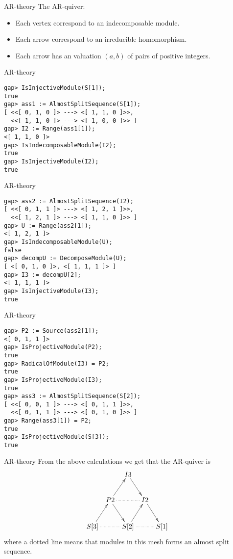 \begin{frame}[fragile]{AR-theory}
The AR-quiver:
\begin{itemize}
\item Each vertex correspond to an indecomposable module. 
\item Each arrow correspond to an irreducible homomorphism. 
\item Each arrow has an valuation $(a,b)$ of pairs of positive
  integers.  
\end{itemize}
\end{frame}

\begin{frame}[fragile]{AR-theory}
\begin{verbatim}
gap> IsInjectiveModule(S[1]);
true
gap> ass1 := AlmostSplitSequence(S[1]);
[ <<[ 0, 1, 0 ]> ---> <[ 1, 1, 0 ]>>, 
  <<[ 1, 1, 0 ]> ---> <[ 1, 0, 0 ]>> ]
gap> I2 := Range(ass1[1]);
<[ 1, 1, 0 ]>
gap> IsIndecomposableModule(I2);
true
gap> IsInjectiveModule(I2);
true
\end{verbatim}
\end{frame}

\begin{frame}[fragile]{AR-theory}
\begin{verbatim}
gap> ass2 := AlmostSplitSequence(I2);
[ <<[ 0, 1, 1 ]> ---> <[ 1, 2, 1 ]>>, 
  <<[ 1, 2, 1 ]> ---> <[ 1, 1, 0 ]>> ]
gap> U := Range(ass2[1]);
<[ 1, 2, 1 ]>
gap> IsIndecomposableModule(U);
false
gap> decompU := DecomposeModule(U);
[ <[ 0, 1, 0 ]>, <[ 1, 1, 1 ]> ]
gap> I3 := decompU[2];
<[ 1, 1, 1 ]>
gap> IsInjectiveModule(I3);
true
\end{verbatim}
\end{frame}

\begin{frame}[fragile]{AR-theory}
\begin{verbatim}
gap> P2 := Source(ass2[1]);
<[ 0, 1, 1 ]>
gap> IsProjectiveModule(P2);
true
gap> RadicalOfModule(I3) = P2;
true
gap> IsProjectiveModule(I3);
true
gap> ass3 := AlmostSplitSequence(S[2]);
[ <<[ 0, 0, 1 ]> ---> <[ 0, 1, 1 ]>>, 
  <<[ 0, 1, 1 ]> ---> <[ 0, 1, 0 ]>> ]
gap> Range(ass3[1]) = P2;
true
gap> IsProjectiveModule(S[3]);
true
\end{verbatim}
\end{frame}

\begin{frame}[fragile]{AR-theory}
From the above calculations we get that the AR-quiver is 
\[\xymatrix@C=5pt{
& & I3\ar[dr] & &  \\
& P2\ar[ur]\ar[dr]\ar@{..}[rr] && I2\ar[dr] & \\
S[3]\ar[ur]\ar@{..}[rr] && S[2]\ar[ur]\ar@{..}[rr] && S[1] 
}\]
where a dotted line means that modules in this mesh forms an almost
split sequence. 
\end{frame}


